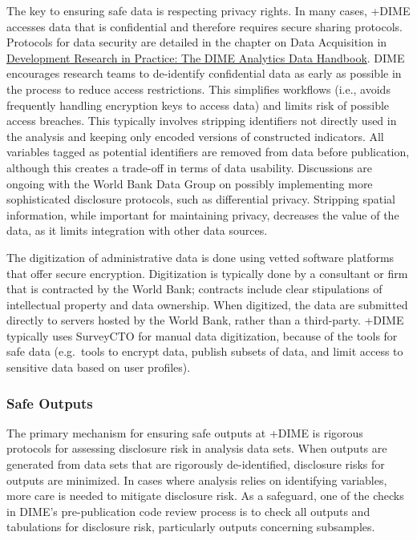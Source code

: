\documentclass[
]{WileySix}
\begin{document}
The key to ensuring safe data is respecting privacy rights. In many cases, +DIME\textbar{} accesses data that is confidential and therefore requires secure sharing protocols. Protocols for data security are detailed in the chapter on Data Acquisition in \href{https://worldbank.github.io/dime-data-handbook/}{Development Research in Practice: The DIME Analytics Data Handbook}. DIME encourages research teams to de-identify confidential data as early as possible in the process to reduce access restrictions. This simplifies workflows (i.e., avoids frequently handling encryption keys to access data) and limits risk of possible access breaches. This typically involves stripping identifiers not directly used in the analysis and keeping only encoded versions of constructed indicators. All variables tagged as potential identifiers are removed from data before publication, although this creates a trade-off in terms of data usability. Discussions are ongoing with the World Bank Data Group on possibly implementing more sophisticated disclosure protocols, such as differential privacy. Stripping spatial information, while important for maintaining privacy, decreases the value of the data, as it limits integration with other data sources.

The digitization of administrative data is done using vetted software platforms that offer secure encryption. Digitization is typically done by a consultant or firm that is contracted by the World Bank; contracts include clear stipulations of intellectual property and data ownership. When digitized, the data are submitted directly to servers hosted by the World Bank, rather than a third-party. +DIME\textbar{} typically uses SurveyCTO for manual data digitization, because of the tools for safe data (e.g.~tools to encrypt data, publish subsets of data, and limit access to sensitive data based on user profiles).

\hypertarget{safe-outputs-7}{%
\subsubsection{Safe Outputs}\label{safe-outputs-7}}

The primary mechanism for ensuring safe outputs at +DIME\textbar{} is rigorous protocols for assessing disclosure risk in analysis data sets. When outputs are generated from data sets that are rigorously de-identified, disclosure risks for outputs are minimized. In cases where analysis relies on identifying variables, more care is needed to mitigate disclosure risk. As a safeguard, one of the checks in DIME's pre-publication code review process is to check all outputs and tabulations for disclosure risk, particularly outputs concerning subsamples.
\end{document}
